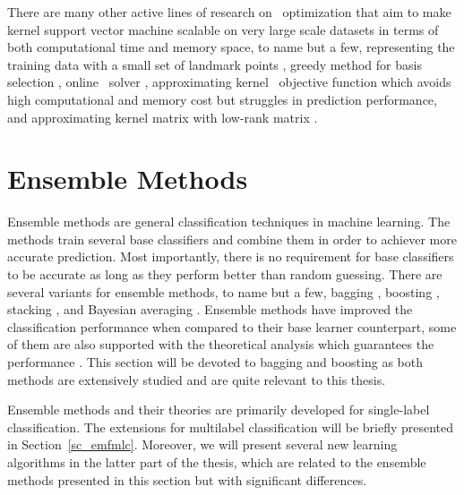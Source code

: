 {There are many other active lines of research on \svm\ optimization that aim to make kernel support vector machine scalable on very large scale datasets in terms of both computational time and memory space, to name but a few, representing the training data with a small set of landmark points \citep{Pavlov00towards,Boley04training,Yu05making,Zhang08improved}, greedy method for basis selection \citep{Keerthi06building}, online \svm\ solver \citep{Bordes05fast}, approximating kernel \svm\ objective function \citep{Zhang12scaling, Le13fast} which avoids high computational and memory cost but struggles in prediction performance, and approximating kernel matrix with low-rank matrix \citep{Smola00sparse,Fine02efficient,Drineas05on,Si14memory}.
\fi


%
%
%
\section{Ensemble Methods} \label{sc_em}

Ensemble methods are general classification techniques in machine learning.
The methods train several base classifiers and combine them in order to achiever more accurate prediction.
Most importantly, there is no requirement for base classifiers to be accurate as long as they perform better than random guessing.
There are several variants for ensemble methods, to name but a few, 
bagging \citep{Breiman96bagging}, 
boosting \citep{Freund97a,Schapire99improved}, 
stacking \citep{Smyth99linearly}, 
and Bayesian averaging \citep{Freund04generalization}.
Ensemble methods have improved the classification performance when compared to their base learner counterpart, some of them are also supported with the theoretical analysis which guarantees the performance \citep{Schapire97boosting,Koltchinskii00empirical,Cortes14semble,Cortes14deep}.
This section will be devoted to bagging and boosting as both methods are extensively studied and are quite relevant to this thesis.

Ensemble methods and their theories are primarily developed for single-label classification.
The extensions for multilabel classification will be briefly presented in Section~\ref{sc_emfmlc}.
Moreover, we will present several new learning algorithms in the latter part of the thesis, which are related to the ensemble methods presented in this section but with significant differences.



}
